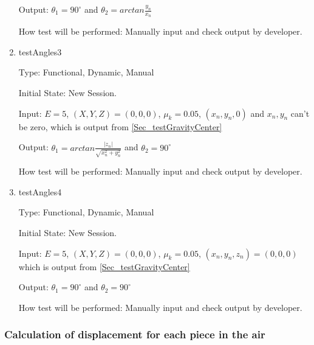 \documentclass[12pt, titlepage]{article}
\begin{document}
\begin{enumerate}
Output: $\theta_{1}=90^{\circ}$ and $\theta_{2}=arctan \frac{y_{n}}{x_{n}}$

How test will be performed: Manually input and check output by developer.

\item{testAngles3\\}

Type: Functional, Dynamic, Manual

Initial State: New Session.

Input: $E = 5$, $(X,Y,Z) = (0,0,0)$, $\mu_{k} = 0.05$, $(x_{n},y_{n},0)$ and $x_{n},y_{n}$ can't be zero, which is output from \ref{Sec_testGravityCenter}  

Output: $\theta_{1}=arctan \frac{|z_{n}|}{\sqrt{x_{n}^2+y_{n}^2}}$ and $\theta_{2}=90^{\circ}$

How test will be performed: Manually input and check output by developer.

\item{testAngles4\\}

Type: Functional, Dynamic, Manual

Initial State: New Session.

Input: $E = 5$, $(X,Y,Z) = (0,0,0)$, $\mu_{k} = 0.05$, $(x_{n},y_{n},z_{n}) = (0,0,0)$ which is output from \ref{Sec_testGravityCenter}  

Output: $\theta_{1}=90^{\circ}$ and $\theta_{2}=90^{\circ}$

How test will be performed: Manually input and check output by developer.

\end{enumerate}



\subsubsection{Calculation of displacement for each piece in the air}
\label{Sec_TestMotionAir}
\end{document}
